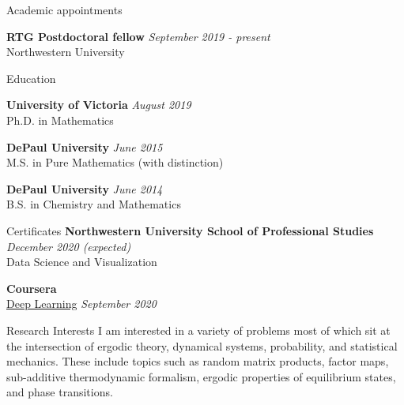 \documentclass{resume} %
\begin{document}
	
\begin{rSection}{Academic appointments}
	
	{\bf RTG Postdoctoral fellow} \hfill {\em September 2019 - present} \\ 
	Northwestern University
	
\end{rSection}


\begin{rSection}{Education}
	
{\bf University of Victoria} \hfill {\em August 2019} \\ 
Ph.D. in Mathematics
	
{\bf DePaul University} \hfill {\em June 2015} \\ 
M.S. in Pure Mathematics (with distinction)	

{\bf DePaul University} \hfill {\em June 2014} \\ 
B.S. in Chemistry and Mathematics 

\end{rSection}

\begin{rSection}{Certificates}
	{\bf Northwestern University School of Professional Studies} \hfill {\em December 2020 (expected)} \\ 
	Data Science and Visualization
	
	{\bf Coursera}  \\ 
	\href{https://coursera.org/share/f9a0d707acde360e04a6f75aa7adecba}{Deep Learning} \hfill \hfill {\em September 2020}
\end{rSection}

\begin{rSection}{Research Interests}
	I am interested in a variety of problems most of which sit at the intersection of ergodic theory, dynamical systems, probability, and statistical mechanics. These include topics such as random matrix products, factor maps, sub-additive thermodynamic formalism, ergodic properties of equilibrium states, and phase transitions.
\end{rSection}
\end{document}
